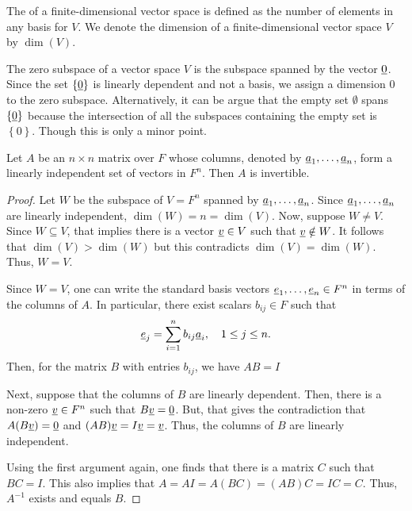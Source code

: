 \begin{definition}
The  of a finite-dimensional vector space is defined as the number of elements in any basis for $V$.
We denote the dimension of a finite-dimensional vector space $V$ by $\dim(V)$.
\end{definition}

The zero subspace of a vector space $V$ is the subspace spanned by the vector $\underline{0}$.
Since the set $\left\{ \underline{0} \right\}$ is linearly dependent and not a basis, we assign a dimension $0$ to the zero subspace.
Alternatively, it can be argue that the empty set $\emptyset$ spans $\left\{ \underline{0} \right\}$ because the intersection of all the subspaces containing the empty set is $\left\{ 0 \right\}$.
Though this is only a minor point.

\begin{theorem}
Let $A$ be an $n \times n$ matrix over $F$ whose columns, denoted by $\underline{a}_1, \ldots, \underline{a}_n$, form a linearly independent set of vectors in $F^{n}$.
Then $A$ is invertible.
\end{theorem}
\begin{proof}
Let $W$ be the subspace of $V=F^n$ spanned by $\underline{a}_1, \ldots, \underline{a}_n$.
Since $\underline{a}_1, \ldots, \underline{a}_n$ are linearly independent, $\dim(W) = n = \dim(V)$.
Now, suppose $W \neq V$.
Since $W \subseteq V$, that implies there is a vector $\underline{v} \in V$ such that $\underline{v} \notin W$.
It follows that $\dim(V) > \dim(W)$ but this contradicts $\dim(V) = \dim(W)$.
Thus, $W=V$.

Since $W = V$, one can write the standard basis vectors  $\underline{e}_1,\ldots,\underline{e}_n \in F^n$ in terms of the columns of $A$.
In particular, there exist scalars $b_{ij} \in F$ such that
\begin{equation*}
\underline{e}_j = \sum_{i=1}^n b_{ij} \underline{a}_i, \quad 1 \leq j \leq n.
\end{equation*}
Then, for the matrix $B$ with entries $b_{ij}$, we have $AB = I$

Next, suppose that the columns of $B$ are linearly dependent.
Then, there is a non-zero $\underline{v} \in F^n$ such that $B\underline{v} = \underline{0}$.
But, that gives the contradiction that $A(B\underline{v}) = \underline{0}$ and $(AB)\underline{v} = I \underline{v} = \underline{v}$.
Thus, the columns of $B$ are linearly independent.

Using the first argument again, one finds that there is a matrix $C$ such that $BC = I$.
This also implies that $A = AI = A(BC) = (AB)C = IC = C$.
Thus, $A^{-1}$ exists and equals $B$.
\end{proof}


